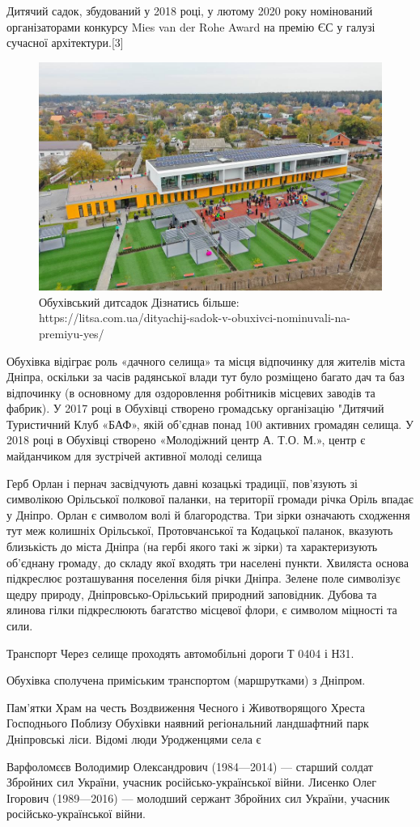 \documentclass[12pt]{article} %
\begin{document}
Дитячий садок, збудований у 2018 році, у лютому 2020 року номінований організаторами конкурсу Mies van der Rohe Award на премію ЄС у галузі сучасної архітектури.[3]
\begin{figure}
	\centering
	\includegraphics[width=0.8\linewidth]{24}
	\caption{	\centering Обухівський дитсадок Дізнатись більше: https://litsa.com.ua/dityachij-sadok-v-obuxivci-nominuvali-na-premiyu-yes/}
	\label{fig:24}
\end{figure}

Обухівка відіграє роль «дачного селища» та місця відпочинку для жителів міста Дніпра, оскільки за часів радянської влади тут було розміщено багато дач та баз відпочинку (в основному для оздоровлення робітників місцевих заводів та фабрик). У 2017 році в Обухівці створено громадську організацію "Дитячий Туристичний Клуб «БАФ», якій об'єднав понад 100 активних громадян селища. У 2018 році в Обухівці створено «Молодіжний центр А. Т.О. М.», центр є майданчиком для зустрічей активної молоді селища

Герб
Орлан і пернач засвідчують давні козацькі традиції, пов’язують зі символікою Орільської полкової паланки, на території громади річка Оріль впадає у Дніпро. Орлан є символом волі й благородства. Три зірки означають сходження тут меж колишніх Орільської, Протовчанської та Кодацької паланок, вказують близькість до міста Дніпра (на гербі якого такі ж зірки) та характеризують об’єднану громаду, до складу якої входять три населені пункти. Хвиляста основа підкреслює розташування поселення біля річки Дніпра. Зелене поле символізує щедру природу, Дніпровсько-Орільський природний заповідник. Дубова та ялинова гілки підкреслюють багатство місцевої флори, є символом міцності та сили.

Транспорт
Через селище проходять автомобільні дороги Т 0404 і Н31.

Обухівка сполучена приміським транспортом (маршрутками) з Дніпром.

Пам'ятки
Храм на честь Воздвиження Чесного і Животворящого Хреста Господнього
Поблизу Обухівки наявний регіональний ландшафтний парк Дніпровські ліси.
Відомі люди
Уродженцями села є

Варфоломєєв Володимир Олександрович (1984—2014) — старший солдат Збройних сил України, учасник російсько-української війни.
Лисенко Олег Ігорович (1989—2016) — молодший сержант Збройних сил України, учасник російсько-української війни.
	
\end{document}

